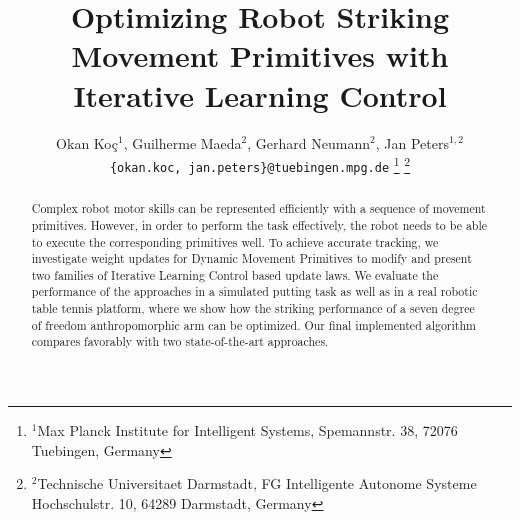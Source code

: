 \documentclass[letterpaper, 10 pt, conference]{ieeeconf}  %
\title{\LARGE \bf
Optimizing Robot Striking Movement Primitives with Iterative Learning Control
}
\author{Okan Ko\c c$^{1}$, Guilherme Maeda$^{2}$, Gerhard Neumann${^2}$, Jan Peters$^{1,2}$%
\\
{\tt\small \{okan.koc, jan.peters\}@tuebingen.mpg.de}%
\thanks{$^{1}$Max Planck Institute for Intelligent Systems,
        Spemannstr. 38, 72076 Tuebingen, Germany}
\thanks{$^{2}$Technische Universitaet Darmstadt, FG Intelligente Autonome Systeme
        Hochschulstr. 10, 64289 Darmstadt, Germany}
}
\begin{document}
\maketitle
\thispagestyle{empty}
\pagestyle{empty}

\begin{abstract}

Complex robot motor skills can be represented efficiently with a sequence of movement primitives. However, in order to perform the task effectively, the robot needs to be able to execute the corresponding primitives well. To achieve accurate tracking, we investigate weight updates for Dynamic Movement Primitives to modify and present two families of Iterative Learning Control based update laws. We evaluate the performance of the approaches in a simulated putting task as well as in a real robotic table tennis platform, where we show how the striking performance of a seven degree of freedom anthropomorphic arm can be optimized. Our final implemented algorithm compares favorably with two state-of-the-art approaches.

\end{abstract}








%
%

\end{document}
